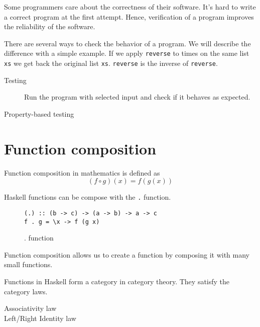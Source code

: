 \documentclass[twoside, a4paper]{article}
\begin{document}
Some programmers care about the correctness of their software. It's hard to write a correct program at the first attempt. 
Hence, verification of a program improves the reliability of the software.

There are several ways to check the behavior of a program. 
We will describe the difference with a simple example.
If we apply \verb|reverse| to times on the same list \verb|xs| we get back the original list \verb|xs|. \verb|reverse| is the inverse of \verb|reverse|. 


\begin{description}
\item[Testing] Run the program with selected input and check if it behaves as expected.
\item[Property-based testing] 
\end{description}

\section{Function composition}
\label{sec:functioncomposition}

Function composition in mathematics is defined as
\begin{equation}
  \label{eq:functioncomposition}
  (f \circ g)(x) = f(g(x))
\end{equation}

Haskell functions can be compose with the \verb|.| function.

\begin{figure}
  \centering
\begin{verbatim}
(.) :: (b -> c) -> (a -> b) -> a -> c
f . g = \x -> f (g x)
\end{verbatim}
  \caption{. function}
  \label{fig:compositionfunction}
\end{figure}

Function composition allows us to create a function by composing it with many small functions. 

Functions in Haskell form a category in category theory. They satisfy the category laws.
\begin{description}
\item[Associativity law] 
\item[Left/Right Identity law] 
\end{description}



\end{document}
